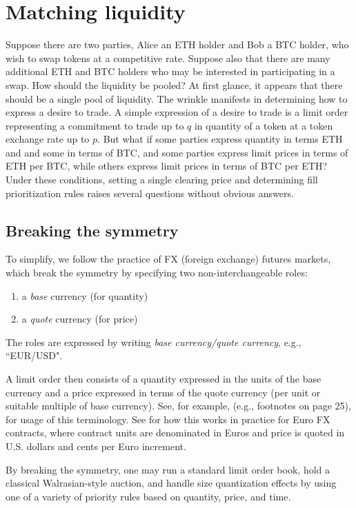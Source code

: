 \documentclass[11pt, reqno]{amsart}
\begin{document}
\section{Matching liquidity}

Suppose there are two parties, Alice an ETH holder and Bob a BTC holder, who
wish to swap tokens at a competitive rate. Suppose also that there are many
additional ETH and BTC holders who may be interested in participating in a
swap. How should the liquidity be pooled? At first glance, it appears that
there should be a single pool of liquidity. The wrinkle manifests in determining
how to express a desire to trade. A simple expression of a desire to trade is
a limit order representing a commitment to trade up to $q$ in quantity of
a token at a token exchange rate up to $p$. But what if some parties express
quantity in terms ETH and and some in terms of BTC, and some parties express
limit prices in terms of ETH per BTC, while others express limit prices in
terms of BTC per ETH? Under these conditions, setting a single clearing price
and determining fill prioritization rules raises several questions without
obvious answers.

\subsection{Breaking the symmetry}

To simplify, we follow the practice of FX (foreign exchange) futures markets,
which break the symmetry by specifying two non-interchangeable roles:
\begin{enumerate}
    \item a \emph{base} currency (for quantity)
    \item a \emph{quote} currency (for price)
\end{enumerate}
The roles are expressed by writing \emph{base currency/quote currency}, e.g.,
``EUR/USD".

A limit order then consists of a quantity expressed in the units of the base
currency and a price expressed in terms of the quote currency (per unit or
suitable multiple of base currency). See, for example, \cite{Cme23} (e.g.,
footnotes on page 25), for usage of this terminology. See \cite{CmeFx} for how
this works in practice for Euro FX contracts, where contract units are
denominated in Euros and price is quoted in U.S. dollars and cents per Euro
increment.

By breaking the symmetry, one may run a standard limit order book, hold a
classical Walrasian-style auction, and handle size quantization effects by
using one of a variety of priority rules based on quantity, price, and time.
\end{document}
